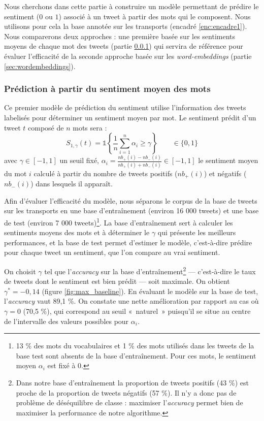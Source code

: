 \documentclass[11pt,french,french]{article}
\let\rmarkdownfootnote\footnote%
\def\footnote{\protect\rmarkdownfootnote}
\begin{document}
Nous cherchons dans cette partie à construire un modèle permettant de
prédire le sentiment (\(0\) ou \(1\)) associé à un tweet à partir des
mots qui le composent. Nous utilisons pour cela la base annotée sur les
transports (encadré \ref{enc:encadre1}). Nous comparerons deux approches
: une première basée sur les sentiments moyens de chaque mot des tweets
(partie \ref{sec:sentiments}) qui servira de référence pour évaluer
l'efficacité de la seconde approche basée sur les \emph{word-embeddings}
(partie \ref{sec:wordembeddings}).

\subsubsection{Prédiction à partir du sentiment moyen des
mots}\label{sec:sentiments}

Ce premier modèle de prédiction du sentiment utilise l'information des
tweets labelisés pour déterminer un sentiment moyen par mot. Le
sentiment prédit d'un tweet \(t\) composé de \(n\) mots sera :
\[S_{1,\gamma}(t) = \mathds{1}\left\{ \frac{1}{n} \sum \limits_{i=1}^n \alpha_i \geq \gamma\right\}  \qquad \in \{ 0,1 \}\]
avec \(\gamma \in [-1,1]\) un seuil fixé,
\(\alpha_i = \frac{nb_+(i) - nb_-(i)}{nb_+(i) + nb_-(i)} \in [-1,1]\) le
sentiment moyen du mot \(i\) calculé à partir du nombre de tweets
positifs (\(nb_+(i)\)) et négatifs (\(nb_-(i)\)) dans lesquels il
apparaît.

Afin d'évaluer l'efficacité du modèle, nous séparons le corpus de la
base de tweets sur les transports en une base d'entraînement (environ 16
000 tweets) et une base de test (environ 7 000 tweets)\footnote{13 \%
  des mots du vocabulaires et 1 \% des mots utilisés dans les tweets de
  la base test sont absents de la base d'entraînement. Pour ces mots, le
  sentiment moyen \(\alpha_i\) est fixé à 0.}. La base d'entraînement
sert à calculer les sentiments moyens des mots et à déterminer le
\(\gamma\) qui présente les meilleurs performances, et la base de test
permet d'estimer le modèle, c'est-à-dire prédire pour chaque tweet un
sentiment, que l'on compare au vrai sentiment.

On choisit \(\gamma\) tel que l'\emph{accuracy} sur la base
d'entraînement\footnote{Dans notre base d'entraînement la proportion de
  tweets positifs (43 \%) est proche de la proportion de tweets négatifs
  (57 \%). Il n'y a donc pas de problème de déséquilibre de classe :
  maximiser l'\emph{accuracy} permet bien de maximiser la performance de
  notre algorithme.} --- c'est-à-dire le taux de tweets dont le
sentiment est bien prédit --- soit maximale. On obtient
\(\gamma^* = -0,14\) (figure \ref{fig:max_baseline}). En évaluant le
modèle sur la base de test, l'\emph{accuracy} vaut 89,1 \%. On constate
une nette amélioration par rapport au cas où \(\gamma = 0\) (70,5 \%),
qui correspond au seuil «~naturel~» puisqu'il se situe au centre de
l'intervalle des valeurs possibles pour \(\alpha_i\).
\end{document}
